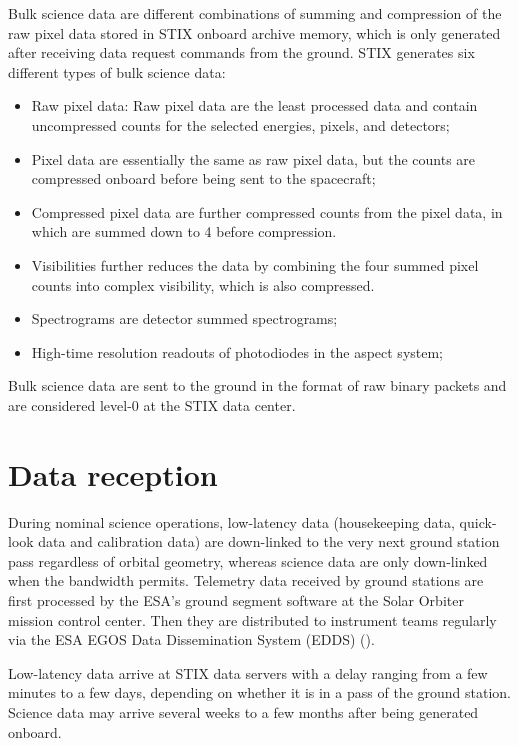 \documentclass[referee]{aa} %
\begin{document}
Bulk science data are different combinations of summing and compression of the raw pixel data stored in STIX 
onboard archive memory, which is only generated after receiving data request commands from the ground. 
STIX generates six different types of bulk science data: 
\begin{itemize}
 \item Raw pixel data: Raw pixel data are the least processed data and contain
  uncompressed counts for the selected energies, pixels, and detectors; 
\item Pixel data are essentially the same as raw pixel data, 
but the counts are compressed onboard before being sent to the spacecraft;
\item Compressed pixel data are further compressed counts from the pixel data,
 in which are summed down to 4 before compression.
\item Visibilities further reduces the data by combining the four summed pixel counts into complex visibility, 
which is also compressed.
\item Spectrograms are detector summed spectrograms; 
\item High-time resolution readouts of photodiodes in the aspect system;
\end{itemize}
Bulk science data are sent to the ground in the format of raw binary packets and  are
considered level-0 at the STIX data center.  



\section{Data reception}

During nominal science operations, low-latency data (housekeeping data, quick-look data and calibration data)
are down-linked to 
the very next ground station pass regardless of orbital geometry, 
whereas science data are only down-linked when the bandwidth permits.
Telemetry data received by ground stations are first processed by the ESA's ground segment
software at the Solar Orbiter mission control center. 
Then they are distributed to instrument teams regularly via the ESA EGOS Data Dissemination System (EDDS) (\cite{EDDS}). 

Low-latency data arrive at STIX data servers with a  delay ranging from 
a few minutes to a few days, depending on whether it is in a pass of the ground station. 
Science data may arrive several weeks to a few months after being generated onboard.
\end{document}
